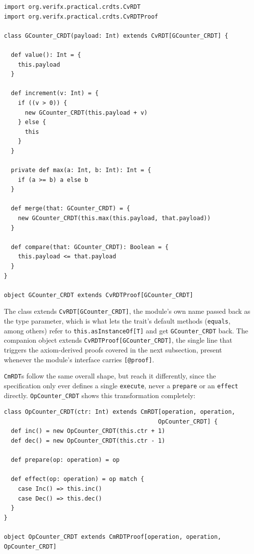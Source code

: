\begin{lstlisting}[caption={\texttt{GCounter\_CRDT}, as generated for VeriFx}, label={lst:vfx-gcounter}]
import org.verifx.practical.crdts.CvRDT
import org.verifx.practical.crdts.CvRDTProof

class GCounter_CRDT(payload: Int) extends CvRDT[GCounter_CRDT] {

  def value(): Int = {
    this.payload
  }

  def increment(v: Int) = {
    if ((v > 0)) {
      new GCounter_CRDT(this.payload + v)
    } else {
      this
    }
  }

  private def max(a: Int, b: Int): Int = {
    if (a >= b) a else b
  }

  def merge(that: GCounter_CRDT) = {
    new GCounter_CRDT(this.max(this.payload, that.payload))
  }

  def compare(that: GCounter_CRDT): Boolean = {
    this.payload <= that.payload
  }
}

object GCounter_CRDT extends CvRDTProof[GCounter_CRDT]
\end{lstlisting}

The class extends \texttt{CvRDT[GCounter\_CRDT]}, the module's own name passed back as the type parameter, which is what
lets the trait's default methods (\texttt{equals}, among others) refer to \texttt{this.asInstanceOf[T]} and get
\texttt{GCounter\_CRDT} back. The companion object extends \texttt{CvRDTProof[GCounter\_CRDT]}, the single line that
triggers the axiom-derived proofs covered in the next subsection, present whenever the module's interface carries
\texttt{[@proof]}.

\texttt{CmRDT}s follow the same overall shape, but reach it differently, since the specification only ever defines a
single \texttt{execute}, never a \texttt{prepare} or an \texttt{effect} directly. \texttt{OpCounter\_CRDT} shows this
transformation completely:

\begin{lstlisting}[caption={\texttt{OpCounter\_CRDT}, showing the \texttt{execute} to \texttt{prepare}/\texttt{effect} split}, label={lst:vfx-opcounter}]
class OpCounter_CRDT(ctr: Int) extends CmRDT[operation, operation, 
                                            OpCounter_CRDT] {
  def inc() = new OpCounter_CRDT(this.ctr + 1)
  def dec() = new OpCounter_CRDT(this.ctr - 1)

  def prepare(op: operation) = op

  def effect(op: operation) = op match {
    case Inc() => this.inc()
    case Dec() => this.dec()
  }
}

object OpCounter_CRDT extends CmRDTProof[operation, operation, OpCounter_CRDT]
\end{lstlisting}

